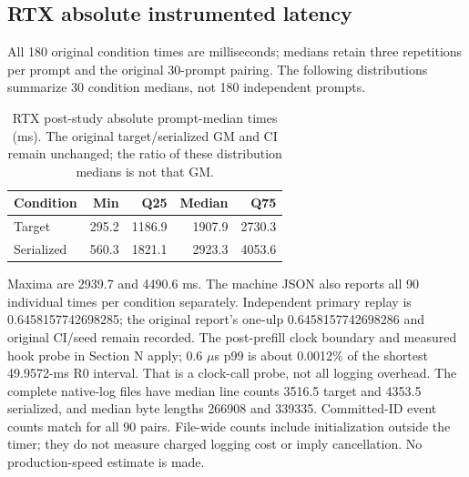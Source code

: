 \subsection{RTX absolute instrumented latency}
All 180 original condition times are milliseconds; medians retain three repetitions per prompt and the original 30-prompt pairing. The following distributions summarize 30 condition medians, not 180 independent prompts.
\begin{table}[t]
\caption{RTX post-study absolute prompt-median times (ms). The original target/serialized GM and CI remain unchanged; the ratio of these distribution medians is not that GM.}
\label{tab:rtxabsolutetime}
\centering
\begin{tabular}{lrrrr}
\toprule
Condition & Min & Q25 & Median & Q75 \\
\midrule
Target & 295.2 & 1186.9 & 1907.9 & 2730.3 \\
Serialized & 560.3 & 1821.1 & 2923.3 & 4053.6 \\
\bottomrule
\end{tabular}
\end{table}
Maxima are 2939.7 and 4490.6 ms. The machine JSON also reports all 90 individual times per condition separately. Independent primary replay is 0.6458157742698285; the original report's one-ulp 0.6458157742698286 and original CI/seed remain recorded. The post-prefill clock boundary and measured hook probe in Section N apply; 0.6 $\mu$s p99 is about 0.0012\% of the shortest 49.9572-ms R0 interval. That is a clock-call probe, not all logging overhead. The complete native-log files have median line counts 3516.5 target and 4353.5 serialized, and median byte lengths 266908 and 339335. Committed-ID event counts match for all 90 pairs. File-wide counts include initialization outside the timer; they do not measure charged logging cost or imply cancellation. No production-speed estimate is made.
